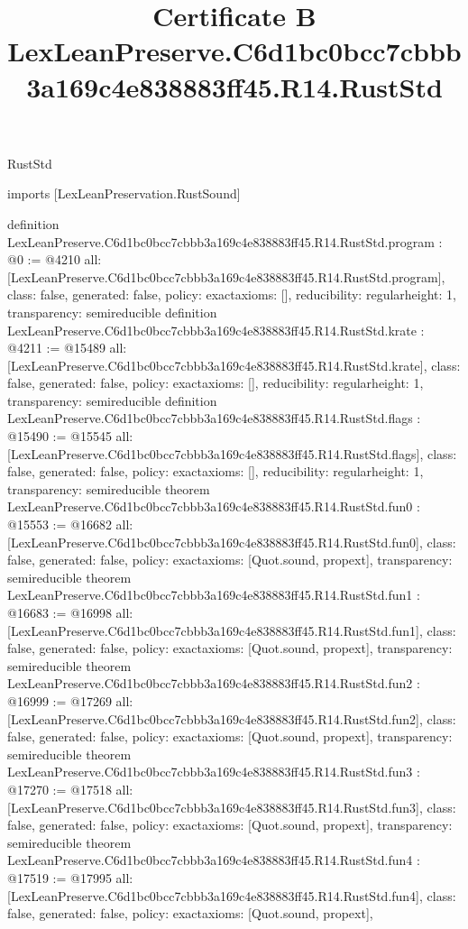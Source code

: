\begin{lexlean}{RustStd}
\title{Certificate B LexLeanPreserve.C6d1bc0bcc7cbbb3a169c4e838883ff45.R14.RustStd}
\begin{coremodule}
imports [LexLeanPreservation.RustSound]

definition LexLeanPreserve.C6d1bc0bcc7cbbb3a169c4e838883ff45.R14.RustStd.program : @0 := @4210 {
  all: [LexLeanPreserve.C6d1bc0bcc7cbbb3a169c4e838883ff45.R14.RustStd.program],
  class: false,
  generated: false,
  policy: exact{axioms: []},
  reducibility: regular{height: 1},
  transparency: semireducible
}
definition LexLeanPreserve.C6d1bc0bcc7cbbb3a169c4e838883ff45.R14.RustStd.krate : @4211 := @15489 {
  all: [LexLeanPreserve.C6d1bc0bcc7cbbb3a169c4e838883ff45.R14.RustStd.krate],
  class: false,
  generated: false,
  policy: exact{axioms: []},
  reducibility: regular{height: 1},
  transparency: semireducible
}
definition LexLeanPreserve.C6d1bc0bcc7cbbb3a169c4e838883ff45.R14.RustStd.flags : @15490 := @15545 {
  all: [LexLeanPreserve.C6d1bc0bcc7cbbb3a169c4e838883ff45.R14.RustStd.flags],
  class: false,
  generated: false,
  policy: exact{axioms: []},
  reducibility: regular{height: 1},
  transparency: semireducible
}
theorem LexLeanPreserve.C6d1bc0bcc7cbbb3a169c4e838883ff45.R14.RustStd.fun0 : @15553 := @16682 {
  all: [LexLeanPreserve.C6d1bc0bcc7cbbb3a169c4e838883ff45.R14.RustStd.fun0],
  class: false,
  generated: false,
  policy: exact{axioms: [Quot.sound, propext]},
  transparency: semireducible
}
theorem LexLeanPreserve.C6d1bc0bcc7cbbb3a169c4e838883ff45.R14.RustStd.fun1 : @16683 := @16998 {
  all: [LexLeanPreserve.C6d1bc0bcc7cbbb3a169c4e838883ff45.R14.RustStd.fun1],
  class: false,
  generated: false,
  policy: exact{axioms: [Quot.sound, propext]},
  transparency: semireducible
}
theorem LexLeanPreserve.C6d1bc0bcc7cbbb3a169c4e838883ff45.R14.RustStd.fun2 : @16999 := @17269 {
  all: [LexLeanPreserve.C6d1bc0bcc7cbbb3a169c4e838883ff45.R14.RustStd.fun2],
  class: false,
  generated: false,
  policy: exact{axioms: [Quot.sound, propext]},
  transparency: semireducible
}
theorem LexLeanPreserve.C6d1bc0bcc7cbbb3a169c4e838883ff45.R14.RustStd.fun3 : @17270 := @17518 {
  all: [LexLeanPreserve.C6d1bc0bcc7cbbb3a169c4e838883ff45.R14.RustStd.fun3],
  class: false,
  generated: false,
  policy: exact{axioms: [Quot.sound, propext]},
  transparency: semireducible
}
theorem LexLeanPreserve.C6d1bc0bcc7cbbb3a169c4e838883ff45.R14.RustStd.fun4 : @17519 := @17995 {
  all: [LexLeanPreserve.C6d1bc0bcc7cbbb3a169c4e838883ff45.R14.RustStd.fun4],
  class: false,
  generated: false,
  policy: exact{axioms: [Quot.sound, propext]},
}
\end{coremodule}
\end{lexlean}
